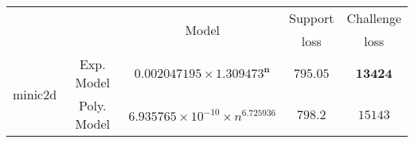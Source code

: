 \begin{tabular}{ccccc} 
\hline 
 &  & \multirow{2}{*}{Model} & Support & Challenge\tabularnewline 
 &  &  & loss  & loss\tabularnewline 
\hline 
\hline 
\multirow{2}{*}{minic2d} & Exp. Model & $\mathbf{0.002047195\times 1.309473^{n}}$ & $\mathbf{795.05}$ & $\mathbf{13424}$ \tabularnewline 
 & Poly. Model & $6.935765\times10^{-10}\times n^{6.725936}$ & $798.2$ & $15143$ \tabularnewline 
\hline 
\end{tabular} 

